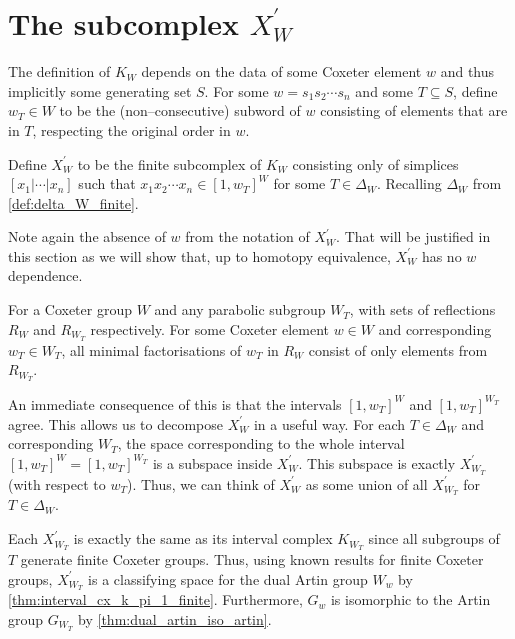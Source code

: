 \documentclass[class=article, crop=false]{standalone}
\begin{document}
\section{The subcomplex $X_{W}^\prime$}
The definition of $K_{W}$ depends on the data of some Coxeter element $w$ and thus implicitly some generating set $S$. For some $w = s_1s_2\cdots s_n$ and some $T\subseteq S$, define $w_T\in W$ to be the (non--consecutive) subword of $w$ consisting of elements that are in $T$, respecting the original order in $w$. 
\begin{definition}
    Define $X_{W}^\prime$ to be the finite subcomplex of $K_{W}$ consisting only of simplices $[x_1 | \cdots | x_n]$ such that $x_1x_2\cdots x_n \in [1,w_T]^W$ for some $T \in \Delta_W$. Recalling $\Delta_W$ from \cref{def:delta_W_finite}.
    \label{def:subcomplex_X_prime}
\end{definition}
Note again the absence of $w$ from the notation of $X^\prime_W$. That will be justified in this section as we will show that, up to homotopy equivalence, $X_W^\prime$ has no $w$ dependence.

\begin{lemma}[{\cite[Lemma 5.2]{paolini_salvetti_kpi1_2021}}]
    For a Coxeter group $W$ and any parabolic subgroup $W_T$, with sets of reflections $R_W$ and $R_{W_T}$ respectively. For some Coxeter element $w \in W$ and corresponding $w_T \in W_T$, all minimal factorisations of $w_T$ in $R_W$ consist of only elements from $R_{W_T}$.
    \label{lem:all_decompositions_of_w_T_are_R}
\end{lemma}
An immediate consequence of this is that the intervals $[1,w_T]^W$ and $[1,w_T]^{W_T}$ agree. This allows us to decompose $X^\prime_W$ in a useful way. For each $T \in \Delta_W$ and corresponding $W_T$, the space corresponding to the whole interval $[1, w_T]^W=[1,w_T]^{W_T}$ is a subspace inside $X^\prime_W$. This subspace is exactly $X^\prime_{W_T}$ (with respect to $w_T$). Thus, we can think of $X^\prime_W$ as some union of all $X^\prime_{W_T}$ for $T \in \Delta_W$.

Each $X^\prime_{W_T}$ is exactly the same as its interval complex $K_{{W_T}}$ since all subgroups of $T$ generate finite Coxeter groups. Thus, using known results for finite Coxeter groups, $X^\prime_{W_T}$ is a classifying space for the dual Artin group $W_w$ by \cref{thm:interval_cx_k_pi_1_finite}. Furthermore, $G_w$ is isomorphic to the Artin group $G_{W_T}$ by \cref{thm:dual_artin_iso_artin}.
\end{document}
